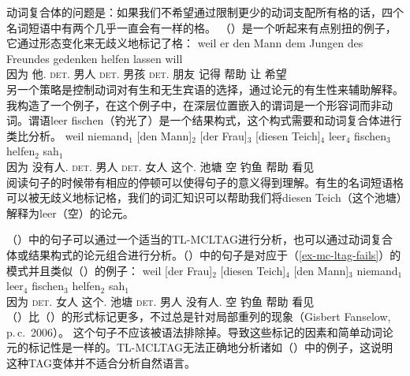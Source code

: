 动词复合体的问题是：如果我们不希望通过限制更少的动词支配所有格的话，四个名词短语中有两个几乎一直会有一样的格。
（）是一个听起来有点别扭的例子，它通过形态变化来无歧义地标记了格：
\ea
\gll weil    er        den        Mann dem        Jungen des Freundes gedenken helfen lassen will\\
     因为 他.\nom{} \textsc{det}.\acc{} 男人  \textsc{det}.\dat{} 男孩    \textsc{det}.\gen{} 朋友 记得 帮助 让 希望 \\
\z
另一个策略是控制动词对有生和无生宾语的选择，通过论元的有生性来辅助解释。
我构造了一个例子，在这个例子中，在深层位置嵌入的谓词是一个形容词而非动词。谓语leer fischen（钓光了）是一个结果构式，这个构式需要和动词复合体进行类比分析\citep[\S~5]{Mueller2002b}。
\ea
\gll weil niemand$_1$ [den Mann]$_2$ [der Frau]$_3$ [diesen Teich]$_4$  leer$_4$ fischen$_3$ helfen$_2$ sah$_1$\\
     因为 没有人.\nom{} \spacebr{}\textsc{det}.\acc{} 男人 \spacebr{}\textsc{det}.\dat{} 女人 \spacebr{}这个.\acc{} 池塘 空 钓鱼 帮助 看见 \\
\z
阅读句子的时候带有相应的停顿可以使得句子的意义得到理解。有生的名词短语格可以被无歧义地标记格，我们的词汇知识可以帮助我们将diesen Teich（这个池塘）解释为leer（空）的论元。 

（）中的句子可以通过一个适当的TL-MCLTAG进行分析，也可以通过动词复合体或结果构式的论元组合进行分析。（）中的句子是对应于（\ref{ex-mc-ltag-fails}）的模式并且类似（）的例子：
\ea
\gll weil [der Frau]$_2$ [diesen Teich]$_4$ [den Mann]$_3$ niemand$_1$ leer$_4$ fischen$_3$ helfen$_2$ sah$_1$\\
  因为 \spacebr{}\textsc{det}.\dat{} 女人 \spacebr{}这个.\acc{} 池塘 \spacebr{}\textsc{det}.\acc{} 男人 没有人.\nom{} 空 钓鱼 帮助 看见 \\
\z
（）比（）的形式标记更多，不过总是针对局部重列的现象（Gisbert Fanselow, p.\,c.\ 2006）。
这个句子不应该被语法排除掉。导致这些标记的因素和简单动词论元的标记性是一样的。TL-MCLTAG无法正确地分析诸如（）中的例子，这说明这种TAG变体并不适合分析自然语言。

